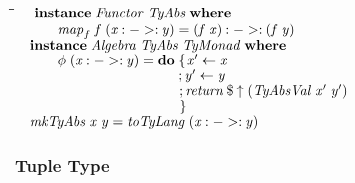 \documentclass[10pt]{article}
\newlength{\lwidth}\setlength{\lwidth}{4.5cm}
\newlength{\cwidth}\setlength{\cwidth}{8mm} %
\newcommand{\Conid}[1]{\mathit{#1}}
\newcommand{\Varid}[1]{\mathit{#1}}
\begin{document}
\begin{tabbing}
\qquad\=\hspace{\lwidth}\=\hspace{\cwidth}\=\+\kill
${\hskip1.00em\relax\mathbf{instance}\;\Conid{Functor}\;\Conid{TyAbs}\;\mathbf{where}}$\\
${\hskip1.00em\relax\hskip2.00em\relax\Varid{map}_{f}\;\Varid{f}\;(\Varid{x}\mathbin{:->:}\Varid{y})\mathrel{=}(\Varid{f}\;\Varid{x})\mathbin{:->:}(\Varid{f}\;\Varid{y})}$\\
${}$\\
${\hskip1.00em\relax\mathbf{instance}\;\Conid{Algebra}\;\Conid{TyAbs}\;\Conid{TyMonad}\;\mathbf{where}}$\\
${\hskip1.00em\relax\hskip2.00em\relax\Varid{\phi}\;(\Varid{x}\mathbin{:->:}\Varid{y})\mathrel{=}\mathbf{do}\;\{\mskip1.5mu \Varid{x'}\leftarrow \Varid{x}}$\\
${\hskip1.00em\relax\hskip2.00em\relax\phantom{\Varid{\phi}\;(\Varid{x}\mathbin{:->:}\Varid{y})\mathrel{=}\mathbf{do}\;\mbox{}};\Varid{y'}\leftarrow \Varid{y}}$\\
${\hskip1.00em\relax\hskip2.00em\relax\phantom{\Varid{\phi}\;(\Varid{x}\mathbin{:->:}\Varid{y})\mathrel{=}\mathbf{do}\;\mbox{}};\Varid{return}\mathbin{\$}\Varid{\uparrow}\;(\Conid{TyAbsVal}\;\Varid{x'}\;\Varid{y'})}$\\
${\hskip1.00em\relax\hskip2.00em\relax\phantom{\Varid{\phi}\;(\Varid{x}\mathbin{:->:}\Varid{y})\mathrel{=}\mathbf{do}\;\mbox{}}\mskip1.5mu\}}$\\
${}$\\
${\hskip1.00em\relax\Varid{mkTyAbs}\;\Varid{x}\;\Varid{y}\mathrel{=}\Varid{toTyLang}\;(\Varid{x}\mathbin{:->:}\Varid{y})}$
\end{tabbing}
\subsubsection{Tuple Type}
\end{document}
